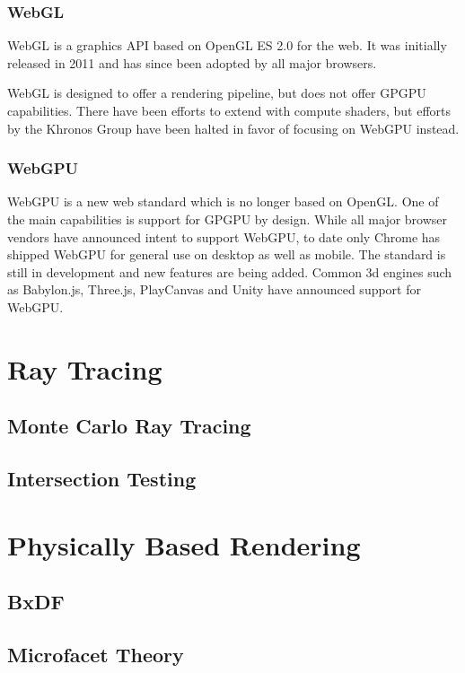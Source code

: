 \subsubsection{WebGL}

WebGL is a graphics API based on OpenGL ES 2.0 for the web. It was initially released in 2011 and has since been adopted by all major browsers.

WebGL is designed to offer a rendering pipeline, but does not offer GPGPU capabilities. There have been efforts to extend with compute shaders, but efforts by the Khronos Group have been halted in favor of focusing on WebGPU instead.

\subsubsection{WebGPU}

WebGPU is a new web standard which is no longer based on OpenGL. One of the main capabilities is support for GPGPU by design. While all major browser vendors have announced intent to support WebGPU, to date only Chrome has shipped WebGPU for general use on desktop as well as mobile.
The standard is still in development and new features are being added.
Common 3d engines such as Babylon.js, Three.js, PlayCanvas and Unity have announced support for WebGPU.

\section{Ray Tracing}
\subsection{Monte Carlo Ray Tracing}
\subsection{Intersection Testing}

\section{Physically Based Rendering}
\subsection{BxDF}
\subsection{Microfacet Theory}
